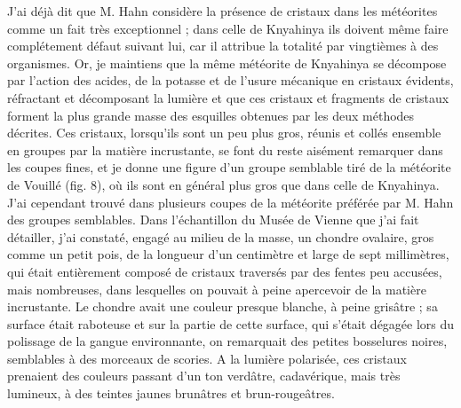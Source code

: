 \documentclass[a4paper, 12pt, oneside, french]{article}
\begin{document}
J'ai déjà dit que M. Hahn considère la présence de cristaux dans les météorites comme un fait très exceptionnel ; dans celle de Knyahinya ils doivent même faire complétement défaut suivant lui, car il attribue la totalité par vingtièmes à des organismes. Or, je maintiens que la même météorite de Knyahinya se décompose par l'action des acides, de la potasse et de l'usure mécanique en cristaux évidents, réfractant et décomposant la lumière et que ces cristaux et fragments de cristaux forment la plus grande masse des esquilles obtenues par les deux méthodes décrites. Ces cristaux, lorsqu'ils sont un peu plus gros, réunis et collés ensemble en groupes par la matière incrustante, se font du reste aisément remarquer dans les coupes fines, et je donne une figure d'un groupe semblable tiré de la météorite de Vouillé (fig. 8), où ils sont en général plus gros que dans celle de Knyahinya. J'ai cependant trouvé dans plusieurs coupes de la météorite préférée par M. Hahn des groupes semblables. Dans l'échantillon du Musée de Vienne que j'ai fait détailler, j'ai constaté, engagé au milieu de la masse, un chondre ovalaire, gros comme un petit pois, de la longueur d'un centimètre et large de sept millimètres, qui était entièrement composé de cristaux traversés par des fentes peu accusées, mais nombreuses, dans lesquelles on pouvait à peine apercevoir de la matière incrustante. Le chondre avait une couleur presque blanche, à peine grisâtre ; sa surface était raboteuse et sur la partie de cette surface, qui s'était dégagée lors du polissage de la gangue environnante, on remarquait des petites bosselures noires, semblables à des morceaux de scories. A la lumière polarisée, ces cristaux prenaient des couleurs passant d'un ton verdâtre, cadavérique, mais très lumineux, à des teintes jaunes brunâtres et brun-rougeâtres.
\end{document}
